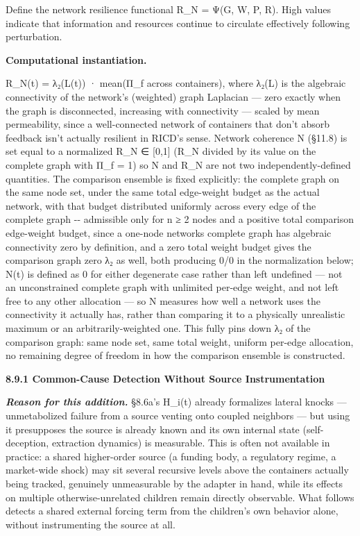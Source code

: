 \documentclass[
]{article}
\begin{document}
Define the network resilience functional R\_N = Ψ(G, W, P, R). High
values indicate that information and resources continue to circulate
effectively following perturbation.

\textbf{Computational instantiation.}

R\_N(t) = λ₂(L(t)) · mean(Π\_f across containers), where λ₂(L) is the
algebraic connectivity of the network's (weighted) graph Laplacian ---
zero exactly when the graph is disconnected, increasing with
connectivity --- scaled by mean permeability, since a well-connected
network of containers that don't absorb feedback isn't actually
resilient in RICD's sense. Network coherence N (§11.8) is set equal to a
normalized R\_N ∈ {[}0,1{]} (R\_N divided by its value on the complete
graph with Π\_f = 1) so N and R\_N are not two independently-defined
quantities. The comparison ensemble is fixed explicitly: the complete
graph on the same node set, under the same total edge-weight budget as
the actual network, with that budget distributed uniformly across every
edge of the complete graph -\/- admissible only for n ≥ 2 nodes and a
positive total comparison edge-weight budget, since a one-node
network\textquotesingle s complete graph has algebraic connectivity zero
by definition, and a zero total weight budget gives the comparison graph
zero λ₂ as well, both producing 0/0 in the normalization below; N(t) is
defined as 0 for either degenerate case rather than left undefined ---
not an unconstrained complete graph with unlimited per-edge weight, and
not left free to any other allocation --- so N measures how well a
network uses the connectivity it actually has, rather than comparing it
to a physically unrealistic maximum or an arbitrarily-weighted one. This
fully pins down λ₂ of the comparison graph: same node set, same total
weight, uniform per-edge allocation, no remaining degree of freedom in
how the comparison ensemble is constructed.

\textbf{8.9.1 Common-Cause Detection Without Source Instrumentation}

\emph{\textbf{Reason for this addition.}} §8.6a's H\_i(t) already
formalizes lateral knocks --- unmetabolized failure from a source
venting onto coupled neighbors --- but using it presupposes the source
is already known and its own internal state (self-deception, extraction
dynamics) is measurable. This is often not available in practice: a
shared higher-order source (a funding body, a regulatory regime, a
market-wide shock) may sit several recursive levels above the containers
actually being tracked, genuinely unmeasurable by the adapter in hand,
while its effects on multiple otherwise-unrelated children remain
directly observable. What follows detects a shared external forcing term
from the children's own behavior alone, without instrumenting the source
at all.
\end{document}
